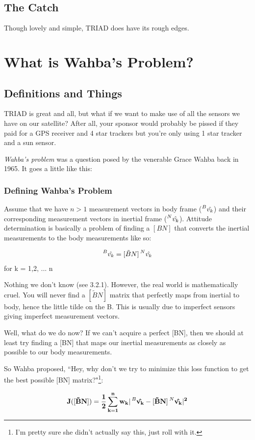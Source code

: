 \documentclass[a4paper,14pt]{extreport}
\newcommand{\vk}[1]{\prescript{#1}{}{\hat{v_k}}}
\begin{document}
\section{The Catch}
Though lovely and simple, TRIAD does have its rough edges.
\chapter{What is Wahba's Problem?}
\section{Definitions and Things}
TRIAD is great and all, but what if we want to make use of all the sensors we have on our satellite? After all, your sponsor would probably be pissed if they paid for a GPS receiver and 4 star trackers but you're only using 1 star tracker and a sun sensor.

\emph{Wahba's problem} was a question posed by the venerable Grace Wahba back in 1965. It goes a little like this:
\subsection{Defining Wahba's Problem}
Assume that we have $n>1$ measurement vectors in body frame ($\vk{B}$) and their corresponding measurement vectors in inertial frame ($\vk{N}$). Attitude determination is basically a problem of finding a $[BN]$ that converts the inertial measurements to the body measurements like so:
\begin{center}
\[
\vk{B}= [\tilde{B}N]\vk{N}
\]
for k = 1,2, ... n
\end{center}
Nothing we don't know (see 3.2.1). However, the real world is mathematically cruel. You will never find a $[\tilde{B}N]$ matrix that perfectly maps from inertial to body, hence the little tilde on the B. This is usually due to imperfect sensors giving imperfect measurement vectors. 

Well, what do we do now? If we can't acquire a perfect [BN], then we should at least try finding a [BN] that maps our inertial measurements as closely as possible to our body measurements. 

So Wahba proposed, ``Hey, why don't we try to minimize this loss function to get the best possible [BN] matrix?"\footnote{I'm pretty sure she didn't actually say this, just roll with it.}:

\[
\mathbf{
J([\tilde{B}N]) = \dfrac{1}{2} \sum^n_{k=1} w_k |\vk{B} - [\tilde{B}N]\vk{N}|^2}
\]
\end{document}
